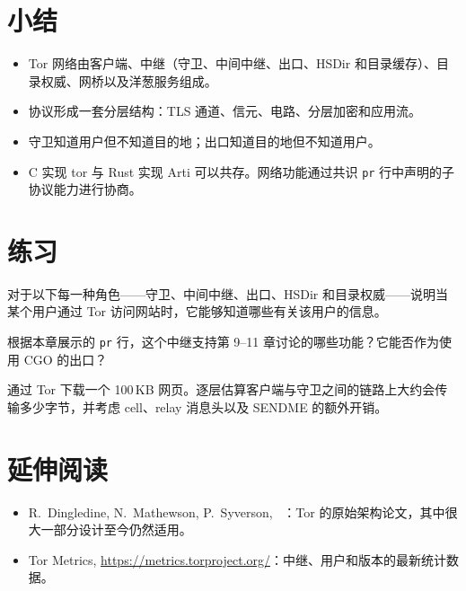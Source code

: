\section*{小结}
\begin{itemize}
  \item Tor 网络由客户端、中继（守卫、中间中继、出口、HSDir 和目录缓存）、目录权威、网桥以及洋葱服务组成。
  \item 协议形成一套分层结构：TLS 通道、信元、电路、分层加密和应用流。
  \item 守卫知道用户但不知道目的地；出口知道目的地但不知道用户。
  \item C 实现 tor 与 Rust 实现 Arti 可以共存。网络功能通过共识 \texttt{pr} 行中声明的子协议能力进行协商。
\end{itemize}

\section*{练习}

\begin{esercizio}[1]\label{es:06-vista}
对于以下每一种角色——守卫、中间中继、出口、HSDir 和目录权威——说明当某个用户通过 Tor 访问网站时，它能够知道哪些有关该用户的信息。
\end{esercizio}

\begin{esercizio}[1]\label{es:06-pr}
根据本章展示的 \texttt{pr} 行，这个中继支持第 9--11 章讨论的哪些功能？它能否作为使用 CGO 的出口？
\end{esercizio}

\begin{esercizio}[2]\label{es:06-livelli}
通过 Tor 下载一个 100\,KB 网页。逐层估算客户端与守卫之间的链路上大约会传输多少字节，并考虑 cell、relay 消息头以及 SENDME 的额外开销。
\end{esercizio}

\section*{延伸阅读}
\begin{itemize}
  \item R.~Dingledine, N.~Mathewson, P.~Syverson, ~\cite{dingledine2004tor}：Tor 的原始架构论文，其中很大一部分设计至今仍然适用。
  \item Tor Metrics, \url{https://metrics.torproject.org/}：中继、用户和版本的最新统计数据。
\end{itemize}
